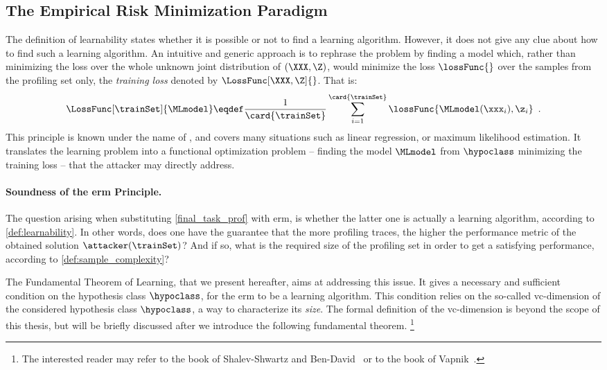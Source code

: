 \subsection{The Empirical Risk Minimization Paradigm}
\label{sec:erm_principle}
The definition of learnability states whether it is possible or not to find a learning algorithm.
However, it does not give any clue about how to find such a learning algorithm.
An intuitive and generic approach is to rephrase the problem by finding a model which, rather than minimizing the loss over the whole unknown joint distribution of \((\XXX, \Z)\), would minimize the loss \(\lossFunc{}\) over the samples from the profiling set only, \aka{} the \emph{training loss} denoted by \(\LossFunc[\XXX, \Z]{}\).
That is:
\begin{equation}
	\LossFunc[\trainSet]{\MLmodel} \eqdef \frac{1}{\card{\trainSet}} \sum_{i=1}^{\card{\trainSet}} \lossFunc{\MLmodel(\xxx_i), \z_i} \enspace .
	\label{eq:empirical_loss}
\end{equation}
This principle is known under the name of , and covers many situations such as linear regression, or maximum likelihood estimation.
It translates the learning problem into a functional optimization problem -- \ie{} finding the model \(\MLmodel\) from \(\hypoclass\) minimizing the training loss -- that the attacker may directly address.


\paragraph{Soundness of the \gls{erm} Principle.}
The question arising when substituting \autoref{final_task_prof} with \gls{erm}, is whether the latter one is actually a learning algorithm, according to \autoref{def:learnability}.
In other words, does one have the guarantee that the more profiling traces, the higher the performance metric of the obtained solution \(\attacker(\trainSet)\)?
And if so, what is the required size of the profiling set in order to get a satisfying performance, according to \autoref{def:sample_complexity}?

The Fundamental Theorem of Learning, that we present hereafter, aims at addressing this issue.
It gives a necessary and sufficient condition on the hypothesis class \(\hypoclass\), for the \gls{erm} to be a learning algorithm.
This condition relies on the so-called \gls{vc}-dimension of the considered hypothesis class \(\hypoclass\), a way to characterize its \emph{size}.
The formal definition of the \gls{vc}-dimension is beyond the scope of this thesis, but will be briefly discussed after we introduce the following fundamental theorem.%
\footnote{
	The interested reader may refer to the book of Shalev-Shwartz and Ben-David~\cite{shalev-shwartz_understanding_2014} or to the book of Vapnik~\cite{vapnik_nature_1995}.
}


